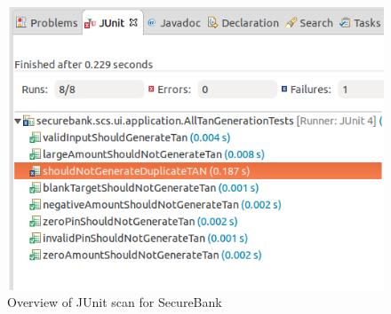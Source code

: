 \begin{figure}[ht]
	\centering
	\includegraphics[width=.8\linewidth]{figures/junit_overview_secure_bank.png}
	\caption{Overview of JUnit scan for SecureBank}
	\label{fig:junit_overview_secure_bank}
\end{figure}